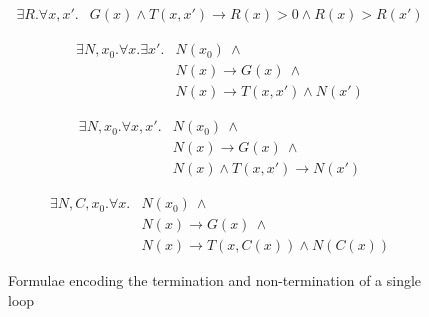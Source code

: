 \documentclass[a4paper]{llncs}
\begin{document}
\begin{figure*}
\begin{framed}
\begin{definition}
\label{def:UT}
\begin{align*}
 \exists R . \forall x, x' . & G(x) \wedge T(x, x') \rightarrow R(x) > 0 \wedge R(x) > R(x')
\end{align*}
\end{definition}

\begin{definition}
\label{def:ont}
 \begin{align*}
  \exists N, x_0 . \forall x . \exists x' . & N(x_0) ~\wedge \\ &  N(x) \rightarrow G(x) ~ \wedge \\
							& N(x) \rightarrow T(x, x') \wedge N(x') 
 \end{align*}
\end{definition}

\begin{definition}
\label{def:cnt}
 \begin{align*}
  \exists N, x_0 . \forall x, x' . & N(x_0) ~ \wedge \\ & N(x) \rightarrow G(x) ~ \wedge \\
							& N(x) \wedge T(x, x') \rightarrow N(x') 
 \end{align*}

\begin{definition}
\label{def:snt}
 \begin{align*}
  \exists N, C, x_0 . \forall x . & N(x_0) ~\wedge \\ &  N(x) \rightarrow G(x) ~ \wedge \\
							& N(x) \rightarrow T(x, C(x)) \wedge N(C(x))
 \end{align*}
\end{definition}

\end{definition}


\end{framed}
\caption{Formulae encoding the termination and non-termination of a single loop} \label{fig:single_loop}
\end{figure*}
\end{document}
